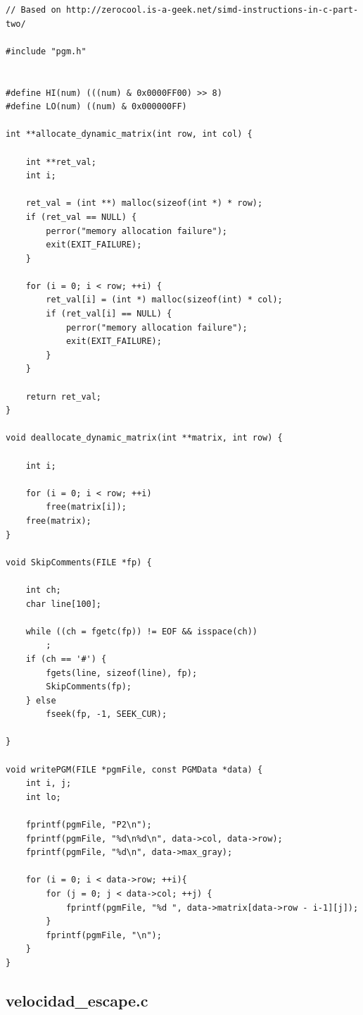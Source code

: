 \documentclass[a4paper,10pt]{article}
\begin{document}
\begin{verbatim}
// Based on http://zerocool.is-a-geek.net/simd-instructions-in-c-part-two/

#include "pgm.h"


#define HI(num)	(((num) & 0x0000FF00) >> 8)
#define LO(num)	((num) & 0x000000FF)

int **allocate_dynamic_matrix(int row, int col) {

	int **ret_val;
	int i;

	ret_val = (int **) malloc(sizeof(int *) * row);
	if (ret_val == NULL) {
		perror("memory allocation failure");
		exit(EXIT_FAILURE);
	}

	for (i = 0; i < row; ++i) {
		ret_val[i] = (int *) malloc(sizeof(int) * col);
		if (ret_val[i] == NULL) {
			perror("memory allocation failure");
			exit(EXIT_FAILURE);
		}
	}

	return ret_val;
}

void deallocate_dynamic_matrix(int **matrix, int row) {

	int i;

	for (i = 0; i < row; ++i)
		free(matrix[i]);
	free(matrix);
}

void SkipComments(FILE *fp) {

	int ch;
	char line[100];

	while ((ch = fgetc(fp)) != EOF && isspace(ch))
		;
	if (ch == '#') {
		fgets(line, sizeof(line), fp);
		SkipComments(fp);
	} else
		fseek(fp, -1, SEEK_CUR);

}

void writePGM(FILE *pgmFile, const PGMData *data) {
	int i, j;
	int lo;

	fprintf(pgmFile, "P2\n");
	fprintf(pgmFile, "%d\n%d\n", data->col, data->row);
	fprintf(pgmFile, "%d\n", data->max_gray);

	for (i = 0; i < data->row; ++i){
		for (j = 0; j < data->col; ++j) {
            fprintf(pgmFile, "%d ", data->matrix[data->row - i-1][j]);
		}
		fprintf(pgmFile, "\n");
	}
}

\end{verbatim}
\pagebreak

\subsection{velocidad\_escape.c}
\end{document}
